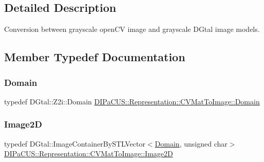 \subsection{Detailed Description}
Conversion between grayscale open\+CV image and grayscale D\+Gtal image models. 



\subsection{Member Typedef Documentation}
\mbox{\label{structDIPaCUS_1_1Representation_1_1CVMatToImage_a5d9aec8c9bd96fa66e4f7ed3a8feac02}} 
\subsubsection{\texorpdfstring{Domain}{Domain}}
{\footnotesize\ttfamily typedef D\+Gtal\+::\+Z2i\+::\+Domain \mbox{\hyperlink{structDIPaCUS_1_1Representation_1_1CVMatToImage_a5d9aec8c9bd96fa66e4f7ed3a8feac02}{D\+I\+Pa\+C\+U\+S\+::\+Representation\+::\+C\+V\+Mat\+To\+Image\+::\+Domain}}}

\mbox{\label{structDIPaCUS_1_1Representation_1_1CVMatToImage_a3e6b8dea7273472226dfb9d161e7ee26}} 
\subsubsection{\texorpdfstring{Image2D}{Image2D}}
{\footnotesize\ttfamily typedef D\+Gtal\+::\+Image\+Container\+By\+S\+T\+L\+Vector$<$\mbox{\hyperlink{structDIPaCUS_1_1Representation_1_1CVMatToImage_a5d9aec8c9bd96fa66e4f7ed3a8feac02}{Domain}}, unsigned char$>$ \mbox{\hyperlink{structDIPaCUS_1_1Representation_1_1CVMatToImage_a3e6b8dea7273472226dfb9d161e7ee26}{D\+I\+Pa\+C\+U\+S\+::\+Representation\+::\+C\+V\+Mat\+To\+Image\+::\+Image2D}}}

